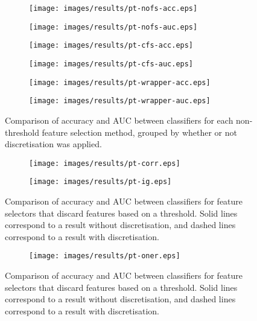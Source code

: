 \begin{figure}[htbp]
\begin{subfigure}{.48\textwidth}
\texttt{[image: images/results/pt-nofs-acc.eps]}
\caption{}
\label{}
\end{subfigure}%
\begin{subfigure}{.55\textwidth}
\texttt{[image: images/results/pt-nofs-auc.eps]}
\caption{}
\label{}
\end{subfigure}

\begin{subfigure}{.48\textwidth}
\texttt{[image: images/results/pt-cfs-acc.eps]}
\caption{}
\label{}
\end{subfigure}%
\begin{subfigure}{.55\textwidth}
\texttt{[image: images/results/pt-cfs-auc.eps]}
\caption{}
\label{}
\end{subfigure}

\begin{subfigure}{.48\textwidth}
\texttt{[image: images/results/pt-wrapper-acc.eps]}
\caption{}
\label{}
\end{subfigure}%
\begin{subfigure}{.55\textwidth}
\texttt{[image: images/results/pt-wrapper-auc.eps]}
\caption{}
\label{}
\end{subfigure}
\caption{Comparison of accuracy and AUC between classifiers for each non-threshold feature selection method, grouped by whether or not discretisation was applied.}
\label{fig:pt-nothreshold}
\end{figure}

\begin{figure}[htbp]
\begin{subfigure}{\textwidth}
\texttt{[image: images/results/pt-corr.eps]}
\caption{}
\label{fig:pt-threshold-corr}
\end{subfigure}
\ContinuedFloat
\begin{subfigure}{\textwidth}
\texttt{[image: images/results/pt-ig.eps]}
\caption{}
\label{}
\end{subfigure}
\caption{Comparison of accuracy and AUC between classifiers for feature selectors that discard features based on a threshold. Solid lines correspond to a result without discretisation, and dashed lines correspond to a result with discretisation.}
\label{fig:pt-threshold}
\end{figure}

\begin{figure}[htbp]
\ContinuedFloat
\begin{subfigure}{\textwidth}
\texttt{[image: images/results/pt-oner.eps]}
\caption{}
\label{}
\end{subfigure}
\caption{Comparison of accuracy and AUC between classifiers for feature selectors that discard features based on a threshold. Solid lines correspond to a result without discretisation, and dashed lines correspond to a result with discretisation.}
\end{figure}

